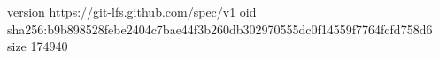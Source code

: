 version https://git-lfs.github.com/spec/v1
oid sha256:b9b898528febe2404c7bae44f3b260db302970555dc0f14559f7764fcfd758d6
size 174940
